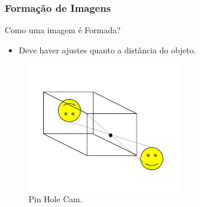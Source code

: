 \documentclass{beamer}
\begin{document}
\begin{frame}
\frametitle{Formação de Imagens}

	\begin{block}{Como uma imagem é Formada?}
		\begin{itemize}
			\item Deve haver ajustes quanto a distância do objeto.
		\end{itemize}
	\end{block}
	\begin{figure}[htb!]
  		\centering
      		\includegraphics[width=0.6\textwidth]{Figures/pinHoleCam}
      		\caption{Pin Hole Cam.}
  		\label{iep}
	\end{figure}


\end{frame}
\end{document}
